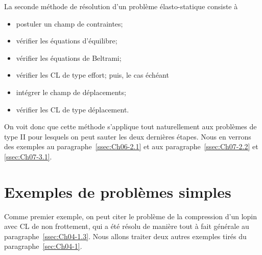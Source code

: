 La seconde méthode de résolution d'un problème élasto-statique consiste à 
\begin{itemize}
    \item postuler un champ de contraintes;
    \item vérifier les équations d'équilibre;
    \item vérifier les équations de Beltrami;
    \item vérifier les CL de type effort;
puis, le cas échéant 
\end{itemize}
\begin{itemize}
    \item intégrer le champ de déplacements;
    \item  vérifier les CL de type déplacement.
\end{itemize}
On voit donc que cette méthode s'applique tout naturellement aux problèmes de type II pour lesquels on peut sauter les deux dernières étapes.
Nous en verrons des exemples au paragraphe~\ref{ssec:Ch06-2.1} et aux paragraphe~\ref{ssec:Ch07-2.2} et \ref{ssec:Ch07-3.1}.

\section{Exemples de problèmes simples} \label{sec:Ch06-2}
Comme premier exemple, on peut citer le problème de la compression d'un lopin avec CL de non frottement, qui a été résolu de manière tout à fait générale au paragraphe~\ref{ssec:Ch04-1.3}.
Nous allons traiter deux autres exemples tirés du paragraphe~\ref{sec:Ch04-1}.

